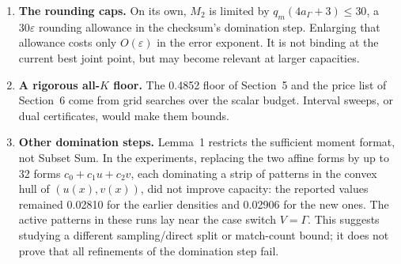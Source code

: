 \documentclass[11pt]{article}
\newcommand{\eps}{\varepsilon}
\theoremstyle{plain}
\begin{document}
\begin{enumerate}
\item \textbf{The rounding caps.} On its own, $M_2$ is limited by $q_m(4a_\Gamma+3) \le 30$, a $30\eps$ rounding allowance in the checksum's domination step. Enlarging that allowance costs only $O(\eps)$ in the error exponent. It is not binding at the current best joint point, but may become relevant at larger capacities.
\item \textbf{A rigorous all-$K$ floor.} The 0.4852 floor of Section~5 and the price list of Section~6 come from grid searches over the scalar budget. Interval sweeps, or dual certificates, would make them bounds.
\item \textbf{Other domination steps.} Lemma~1 restricts the sufficient moment format, not Subset Sum. In the experiments, replacing the two affine forms by up to 32 forms $c_0+c_1u+c_2v$, each dominating a strip of patterns in the convex hull of $(u(x),v(x))$, did not improve capacity: the reported values remained 0.02810 for the earlier densities and 0.02906 for the new ones. The active patterns in these runs lay near the case switch $V=\Gamma$. This suggests studying a different sampling/direct split or match-count bound; it does not prove that all refinements of the domination step fail.


\end{enumerate}
\end{document}
